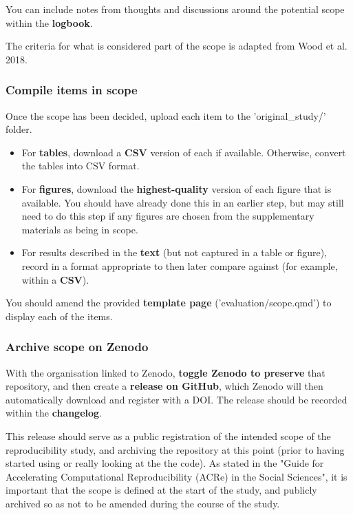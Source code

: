 You can include notes from thoughts and discussions around the potential scope within the \textbf{logbook}.

The criteria for what is considered part of the scope is adapted from Wood et al. 2018.\autocite{wood_replication_2018, wood_push_2018}

\vspace{0.5cm}
\subsubsection{Compile items in scope}

Once the scope has been decided, upload each item to the 'original\_study/' folder.

\begin{itemize}
    \item For \textbf{tables}, download a \textbf{CSV} version of each if available. Otherwise, convert the tables into CSV format.
    \item For \textbf{figures}, download the \textbf{highest-quality} version of each figure that is available. You should have already done this in an earlier step, but may still need to do this step if any figures are chosen from the supplementary materials as being in scope.
    \item For results described in the \textbf{text} (but not captured in a table or figure), record in a format appropriate to then later compare against (for example, within a \textbf{CSV}).
\end{itemize}

You should amend the provided \textbf{template page} ('evaluation/scope.qmd') to display each of the items.

\vspace{0.5cm}
\subsubsection{Archive scope on Zenodo}

With the organisation linked to Zenodo, \textbf{toggle Zenodo to preserve} that repository, and then create a \textbf{release on GitHub}, which Zenodo will then automatically download and register with a DOI. The release should be recorded within the \textbf{changelog}.

This release should serve as a public registration of the intended scope of the reproducibility study, and archiving the repository at this point (prior to having started using or really looking at the the code). As stated in the "Guide for Accelerating Computational Reproducibility (ACRe) in the Social Sciences", it is important that the scope is defined at the start of the study, and publicly archived so as not to be amended during the course of the study.\cite{berkeley_initiative_for_transparency_in_the_social_sciences_guide_2022}

